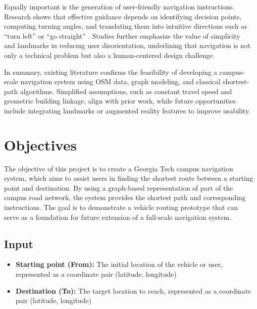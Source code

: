 \documentclass[fleqn,10pt]{olplainarticle}
\begin{document}
Equally important is the generation of user-friendly navigation instructions. Research shows that effective guidance depends on identifying decision points, computing turning angles, and translating them into intuitive directions such as “turn left” or “go straight” \cite{RICHTER2008233}. Studies further emphasize the value of simplicity and landmarks in reducing user disorientation, underlining that navigation is not only a technical problem but also a human-centered design challenge.

In summary, existing literature confirms the feasibility of developing a campus-scale navigation system using OSM data, graph modeling, and classical shortest-path algorithms. Simplified assumptions, such as constant travel speed and geometric building linkage, align with prior work, while future opportunities include integrating landmarks or augmented reality features to improve usability.

\section*{Objectives}
The objective of this project is to create a Georgia Tech campus navigation system, which aims to assist users in finding the shortest route between a starting point and destination. By using a graph-based representation of part of the campus road network, the system provides the shortest path and corresponding instructions. The goal is to demonstrate a vehicle routing prototype that can serve as a foundation for future extension of a full-scale navigation system.

\subsection*{Input}
\begin{itemize}
    \item \textbf{Starting point (From):} The initial location of the vehicle or user, represented as a coordinate pair (latitude, longitude)
    \item \textbf{Destination (To):} The target location to reach, represented as a coordinate pair (latitude, longitude)
\end{itemize}
\end{document}
